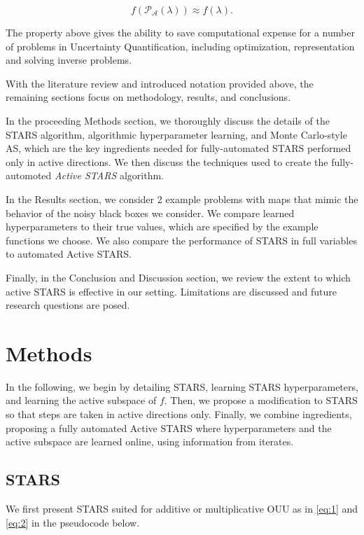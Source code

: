 \documentclass{amsart}
\newcommand{\A}{\mathcal{A}}
\begin{document}
\begin{equation} \label{eq:8}
f\left(\mathcal{P}_\A(\lambda)\right) \approx f(\lambda).
\end{equation}

The property above gives the ability to save computational expense for a number of problems in Uncertainty Quantification, including optimization, representation and solving inverse problems. 

\vspace{1cm}

With the literature review and introduced notation provided above, the remaining sections focus on methodology, results, and conclusions. 

In the proceeding Methods section, we thoroughly discuss the details of the STARS algorithm, algorithmic hyperparameter learning, and Monte Carlo-style AS, which are the key ingredients needed for fully-automated STARS performed only in active directions. We then discuss the techniques used to create the fully-automoted \textit{Active STARS} algorithm.

In the Results section, we consider 2 example problems with maps that mimic the behavior of the noisy black boxes we consider. We compare learned hyperparameters to their true values, which are specified by the example functions we choose. We also compare the performance of STARS in full variables to automated Active STARS.

Finally, in the Conclusion and Discussion section, we review the extent to which active STARS is effective in our setting. Limitations are discussed and future research questions are posed. 

\section{Methods}

In the following, we begin by detailing STARS, learning STARS hyperparameters, and learning the active subspace of $f$. Then, we propose a modification to STARS so that steps are taken in active directions only. Finally, we combine ingredients, proposing a fully automated Active STARS where hyperparameters and the active subspace are learned online, using information from iterates.


\subsection{STARS}

We first present STARS suited for additive or multiplicative OUU as in \eqref{eq:1} and \eqref{eq:2} in the  pseudocode below.
\end{document}
